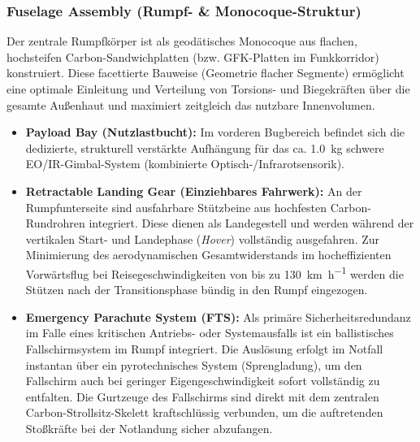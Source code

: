 \subsubsection{Fuselage Assembly (Rumpf- \& Monocoque-Struktur)}
Der zentrale Rumpfkörper ist als geodätisches Monocoque aus flachen, hochsteifen Carbon-Sandwichplatten (bzw. GFK-Platten im Funkkorridor) konstruiert. Diese facettierte Bauweise (Geometrie flacher Segmente) ermöglicht eine optimale Einleitung und Verteilung von Torsions- und Biegekräften über die gesamte Außenhaut und maximiert zeitgleich das nutzbare Innenvolumen.
\begin{itemize}
    \item \textbf{Payload Bay (Nutzlastbucht):} Im vorderen Bugbereich befindet sich die dedizierte, strukturell verstärkte Aufhängung für das ca. \SI{1.0}{\kg} schwere EO/IR-Gimbal-System (kombinierte Optisch-/Infrarotsensorik).
    \item \textbf{Retractable Landing Gear (Einziehbares Fahrwerk):} An der Rumpfunterseite sind ausfahrbare Stützbeine aus hochfesten Carbon-Rundrohren integriert. Diese dienen als Landegestell und werden während der vertikalen Start- und Landephase (\textit{Hover}) vollständig ausgefahren. Zur Minimierung des aerodynamischen Gesamtwiderstands im hocheffizienten Vorwärtsflug bei Reisegeschwindigkeiten von bis zu \SI{130}{\km\per\hour} werden die Stützen nach der Transitionsphase bündig in den Rumpf eingezogen.
    \item \textbf{Emergency Parachute System (FTS):} Als primäre Sicherheitsredundanz im Falle eines kritischen Antriebs- oder Systemausfalls ist ein ballistisches Fallschirmsystem im Rumpf integriert. Die Auslösung erfolgt im Notfall instantan über ein pyrotechnisches System (Sprengladung), um den Fallschirm auch bei geringer Eigengeschwindigkeit sofort vollständig zu entfalten. Die Gurtzeuge des Fallschirms sind direkt mit dem zentralen Carbon-Strollsitz-Skelett kraftschlüssig verbunden, um die auftretenden Stoßkräfte bei der Notlandung sicher abzufangen.
\end{itemize}

